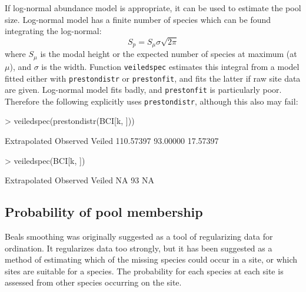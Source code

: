 \documentclass[a4paper,10pt]{amsart}
\begin{document}
If log-normal abundance model is appropriate, it can be used to
estimate the pool size.  Log-normal model has a finite number of
species which can be found integrating the log-normal:
\begin{equation}
S_p = S_\mu \sigma \sqrt{2 \pi}
\end{equation}
where $S_\mu$ is the modal height or the expected number of species at
maximum (at $\mu$), and $\sigma$ is the width.  Function
\texttt{veiledspec} estimates this integral from a model fitted either
with \texttt{prestondistr} or \texttt{prestonfit}, and fits the latter
if raw site data are given.  Log-normal model fits badly, and
\texttt{prestonfit} is particularly poor.  Therefore the following
explicitly uses \texttt{prestondistr}, although this also may fail:
\begin{Schunk}
\begin{Sinput}
> veiledspec(prestondistr(BCI[k, ]))
\end{Sinput}
\begin{Soutput}
Extrapolated     Observed       Veiled 
   110.57397     93.00000     17.57397 
\end{Soutput}
\begin{Sinput}
> veiledspec(BCI[k, ])
\end{Sinput}
\begin{Soutput}
Extrapolated     Observed       Veiled 
          NA           93           NA 
\end{Soutput}
\end{Schunk}

\subsection{Probability of pool membership}

Beals smoothing was originally suggested as a tool of regularizing data
for ordination.  It regularizes data too strongly,
but it has been suggested as a method of estimating which of the
missing species could occur in a site, or which sites are suitable for
a species.  The probability for each species at each site is assessed
from other species occurring on the site.
\end{document}
